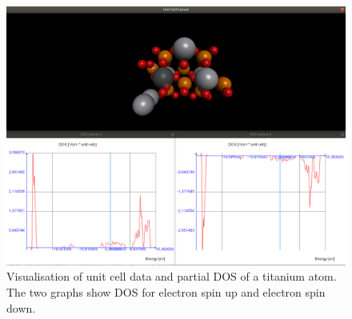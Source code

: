 \documentclass[a4paper,12pt]{article}
\begin{document}
\begin{figure}[H]
    \centering
    \includegraphics[scale=0.4]{screenshot_unitcell_dos.png}
    \caption{Visualisation of unit cell data and partial DOS of a titanium atom. The two graphs show DOS for electron spin up and electron spin down.}
    \label{fig:unitcell_dos}
\end{figure}


\newpage
{}
\printbibliography{}
\end{document}
